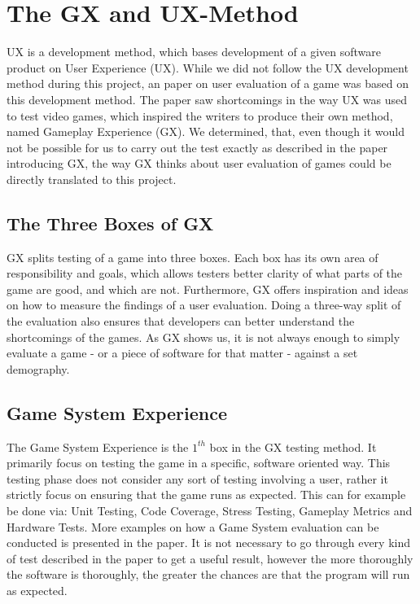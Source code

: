 \section{The GX and UX-Method}
\label{sec:gx_ux_method}
UX is a development method, which bases development of a given software product on User Experience (UX).
While we did not follow the UX development method during this project, an paper on user evaluation of a game was based on this development method.
The paper saw shortcomings in the way UX was used to test video games, which inspired the writers to produce their own method, named Gameplay Experience (GX).
We determined, that, even though it would not be possible for us to carry out the test exactly as described in the paper introducing GX, the way GX thinks about user evaluation of games could be directly translated to this project.

\subsection{The Three Boxes of GX}
GX splits testing of a game into three boxes.
Each box has its own area of responsibility and goals, which allows testers better clarity of what parts of the game are good, and which are not.
Furthermore, GX offers inspiration and ideas on how to measure the findings of a user evaluation.
Doing a three-way split of the evaluation also ensures that developers can better understand the shortcomings of the games.
As GX shows us, it is not always enough to simply evaluate a game - or a piece of software for that matter - against a set demography.

\subsection{Game System Experience}
The Game System Experience is the $1^{th}$ box in the GX testing method.
It primarily focus on testing the game in a specific, software oriented way.
This testing phase does not consider any sort of testing involving a user, rather it strictly focus on ensuring that the game runs as expected.
This can for example be done via: Unit Testing, Code Coverage, Stress Testing, Gameplay Metrics and Hardware Tests.
More examples on how a Game System evaluation can be conducted is presented in the paper.
It is not necessary to go through every kind of test described in the paper to get a useful result, however the more thoroughly the software is thoroughly, the greater the chances are that the program will run as expected.

